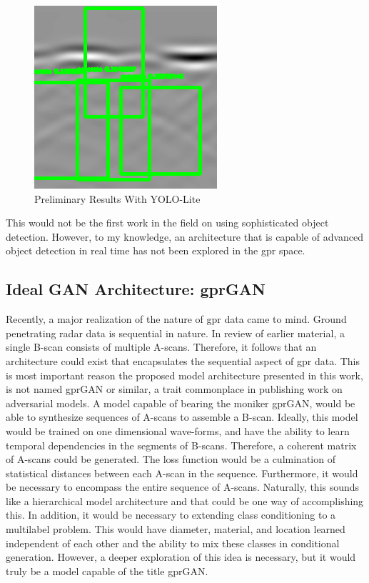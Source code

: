 \begin{figure}[H]
    \centering
    \includegraphics[width=0.6\linewidth]{figures/gpr_yolo.png}
    \caption{Preliminary Results With YOLO-Lite}
    \label{fig:yolo-lite}
\end{figure}

This would not be the first work in the field on using sophisticated object detection. However, to my knowledge, an architecture that is capable of advanced object detection in real time has not been explored in the \acrshort{gpr} space.

\subsection{Ideal GAN Architecture: gprGAN}
Recently, a major realization of the nature of \acrshort{gpr} data came to mind. Ground penetrating radar data is sequential in nature. In review of earlier material, a single B-scan consists of multiple A-scans. Therefore, it follows that an architecture could exist that encapsulates the sequential aspect of \acrshort{gpr} data. This is most important reason the proposed model architecture presented in this work, is not named gprGAN or similar, a trait commonplace in publishing work on adversarial models. A model capable of bearing the moniker gprGAN, would be able to synthesize sequences of A-scans to assemble a B-scan. Ideally, this model would be trained on one dimensional wave-forms, and have the ability to learn temporal dependencies in the segments of B-scans. Therefore, a coherent matrix of A-scans could be generated. The loss function would be a culmination of statistical distances between each A-scan in the sequence. Furthermore, it would be necessary to encompass the entire sequence of A-scans. Naturally, this sounds like a hierarchical model architecture and that could be one way of accomplishing this. In addition, it would be necessary to extending class conditioning to a multilabel problem. This would have diameter, material, and location learned independent of each other and the ability to mix these classes in conditional generation. However, a deeper exploration of this idea is necessary, but it would truly be a model capable of the title gprGAN. 